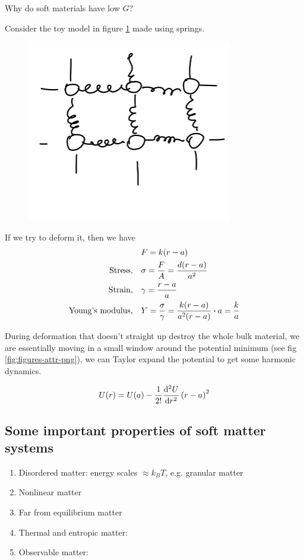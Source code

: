 \documentclass[a4paper]{article}
\begin{document}
Why do soft materials have low $G$?

Consider the toy model in figure \ref{fig:spring-png} made using springs.

\begin{figure}[h]
	\centering
	\includegraphics[width=0.8\textwidth]{figures/spring.png}
	\caption{}
	\label{fig:spring-png}
\end{figure}
If we try to deform it, then we have
\begin{equation}
	\begin{split}
		&F = k(r - a)\\
		\text{Stress,}\quad&\sigma = \frac{F}{A} = \frac{d(r-a)}{a^2}\\
			\text{Strain,}\quad &\gamma = \frac{r-a}{a}\\
			\text{Young's modulus,}\quad &Y = \frac{\sigma}{\gamma} = \frac{k(r-a)}{a^2(r -a)}\vdot a = \frac{k}{a}
	\end{split}
\end{equation}

During deformation that doesn't straight up destroy the whole bulk
material, we are essentially moving in a small window around the
potential minimum (see fig \ref{fig:figures-attr-png}), we can Taylor
expand the potential to get some harmonic dynamics.

\begin{equation}
	U(r) = U(a) - \frac{1}{2!}\dv[2]{U}{r} \left( r -a \right) ^2
\end{equation}


\subsection*{Some important properties of soft matter systems}
\begin{enumerate}
	\item Disordered matter: energy scales $\approx k_B T$, e.g. granular matter
	\item Nonlinear matter
	\item Far from equilibrium matter
	\item Thermal and entropic matter: 
	\item Observable matter: 
\end{enumerate}
\end{document}
